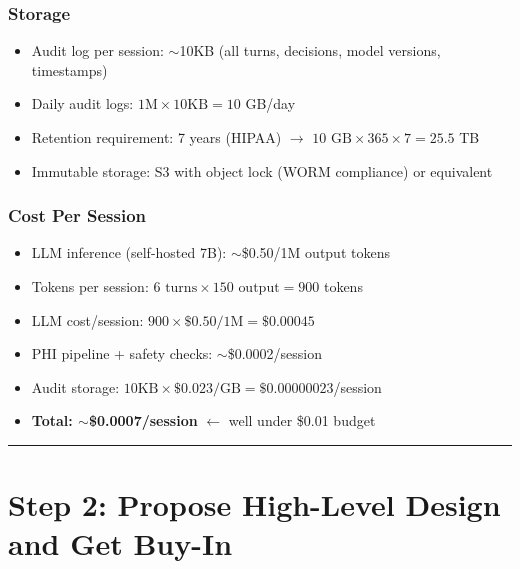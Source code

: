 \subsubsection*{Storage}
\begin{itemize}
  \item Audit log per session: $\sim$10KB (all turns, decisions, model versions, timestamps)
  \item Daily audit logs: $1\text{M} \times 10\text{KB} = 10$ GB/day
  \item Retention requirement: 7 years (HIPAA) $\rightarrow$ $10 \text{ GB} \times 365 \times 7 = 25.5$ TB
  \item Immutable storage: S3 with object lock (WORM compliance) or equivalent
\end{itemize}

\subsubsection*{Cost Per Session}
\begin{itemize}
  \item LLM inference (self-hosted 7B): $\sim$\$0.50/1M output tokens
  \item Tokens per session: $6 \text{ turns} \times 150 \text{ output} = 900$ tokens
  \item LLM cost/session: $900 \times \$0.50/\text{1M} = \$0.00045$
  \item PHI pipeline + safety checks: $\sim$\$0.0002/session
  \item Audit storage: $10\text{KB} \times \$0.023/\text{GB} = \$0.00000023$/session
  \item \textbf{Total: $\sim$\$0.0007/session} $\leftarrow$ well under \$0.01 budget
\end{itemize}

\bigskip\hrule\bigskip

\section*{Step 2: Propose High-Level Design and Get Buy-In}

